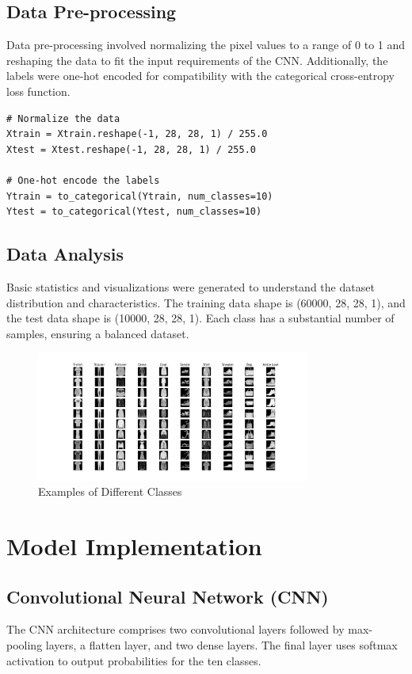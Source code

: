 \documentclass[a4paper,10pt]{article}
\begin{document}
\subsection{Data Pre-processing}
Data pre-processing involved normalizing the pixel values to a range of 0 to 1 and reshaping the data to fit the input requirements of the CNN. Additionally, the labels were one-hot encoded for compatibility with the categorical cross-entropy loss function.

\begin{verbatim}
# Normalize the data
Xtrain = Xtrain.reshape(-1, 28, 28, 1) / 255.0
Xtest = Xtest.reshape(-1, 28, 28, 1) / 255.0

# One-hot encode the labels
Ytrain = to_categorical(Ytrain, num_classes=10)
Ytest = to_categorical(Ytest, num_classes=10)
\end{verbatim}

\subsection{Data Analysis}
Basic statistics and visualizations were generated to understand the dataset distribution and characteristics. The training data shape is (60000, 28, 28, 1), and the test data shape is (10000, 28, 28, 1). Each class has a substantial number of samples, ensuring a balanced dataset.

\begin{figure}[h]
\centering
\includegraphics[width=0.8\textwidth]{1.png}
\caption{Examples of Different Classes}
\end{figure}

\section{Model Implementation}

\subsection{Convolutional Neural Network (CNN)}
The CNN architecture comprises two convolutional layers followed by max-pooling layers, a flatten layer, and two dense layers. The final layer uses softmax activation to output probabilities for the ten classes.
\end{document}
